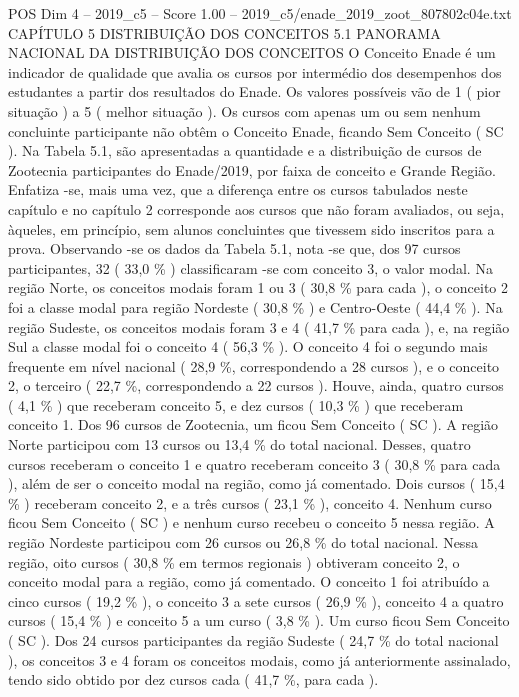 \begin{textsample}{POS Dim 4 – 2019\_c5 – Score 1.00 – 2019\_c5/enade\_2019\_zoot\_807802c04e.txt}  \label{ex:f4_pos_199}
CAPÍTULO 5 DISTRIBUIÇÃO DOS CONCEITOS 5.1 PANORAMA NACIONAL DA DISTRIBUIÇÃO DOS CONCEITOS O Conceito Enade é um indicador de qualidade que avalia os cursos por intermédio dos desempenhos dos estudantes a partir dos resultados do Enade.
Os valores possíveis vão de 1 ( pior situação ) a 5 ( melhor situação ).
Os cursos com apenas um ou sem nenhum concluinte participante não obtêm o Conceito Enade, ficando Sem Conceito ( SC ).
Na Tabela 5.1, são apresentadas a quantidade e a distribuição de cursos de Zootecnia participantes do Enade/2019, por faixa de conceito e Grande Região.
Enfatiza -se, mais uma vez, que a diferença entre os cursos tabulados neste capítulo e no capítulo 2 corresponde aos cursos que não foram avaliados, ou seja, àqueles, em princípio, sem alunos concluintes que tivessem sido inscritos para a prova.
Observando -se os dados da Tabela 5.1, nota -se que, dos 97 cursos participantes, 32 ( 33,0 \% ) classificaram -se com conceito 3, o valor modal.
Na região Norte, os conceitos modais foram 1 ou 3 ( 30,8 \% para cada ), o conceito 2 foi a classe modal para região Nordeste ( 30,8 \% ) e Centro-Oeste ( 44,4 \% ).
Na região Sudeste, os conceitos modais foram 3 e 4 ( 41,7 \% para cada ), e, na região Sul a classe modal foi o conceito 4 ( 56,3 \% ).
O conceito 4 foi o segundo mais frequente em nível nacional ( 28,9 \%, correspondendo a 28 cursos ), e o conceito 2, o terceiro ( 22,7 \%, correspondendo a 22 cursos ).
Houve, ainda, quatro cursos ( 4,1 \% ) que receberam conceito 5, e dez cursos ( 10,3 \% ) que receberam conceito 1.
Dos 96 cursos de Zootecnia, um ficou Sem Conceito ( SC ).
A região Norte participou com 13 cursos ou 13,4 \% do total nacional.
Desses, quatro cursos receberam o conceito 1 e quatro receberam conceito 3 ( 30,8 \% para cada ), além de ser o conceito modal na região, como já comentado.
Dois cursos ( 15,4 \% ) receberam conceito 2, e a três cursos ( 23,1 \% ), conceito 4.
Nenhum curso ficou Sem Conceito ( SC ) e nenhum curso recebeu o conceito 5 nessa região.
A região Nordeste participou com 26 cursos ou 26,8 \% do total nacional.
Nessa região, oito cursos ( 30,8 \% em termos regionais ) obtiveram conceito 2, o conceito modal para a região, como já comentado.
O conceito 1 foi atribuído a cinco cursos ( 19,2 \% ), o conceito 3 a sete cursos ( 26,9 \% ), conceito 4 a quatro cursos ( 15,4 \% ) e conceito 5 a um curso ( 3,8 \% ).
Um curso ficou Sem Conceito ( SC ).
Dos 24 cursos participantes da região Sudeste ( 24,7 \% do total nacional ), os conceitos 3 e 4 foram os conceitos modais, como já anteriormente assinalado, tendo sido obtido por dez cursos cada ( 41,7 \%, para cada ).

\end{textsample}
